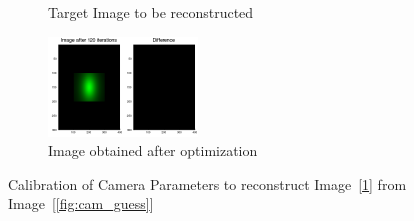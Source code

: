 \documentclass{juliacon}
\begin{document}
\begin{figure}[!htb]
\begin{subfigure}[b]{0.23\textwidth}
        \caption{Target Image to be reconstructed}
        \label{fig:cam_target}
    \end{subfigure}
    \centering
    \begin{subfigure}[b]{0.5\textwidth}
        \centering
        \includegraphics[width=\textwidth, height=100px]{images/camera/iter_120.png}
        \caption{Image obtained after optimization}
    \end{subfigure}
    \caption{Calibration of Camera Parameters to reconstruct Image~[\ref{fig:cam_target}] from Image~[\ref{fig:cam_guess}]}
    \label{fig:cam_invrender}
\end{figure}
\end{document}
